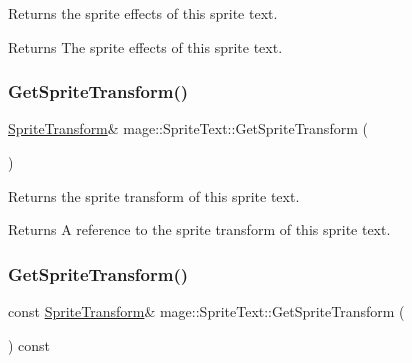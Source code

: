 Returns the sprite effects of this sprite text.

\begin{DoxyReturn}{Returns}
The sprite effects of this sprite text. 
\end{DoxyReturn}
\hypertarget{classmage_1_1_sprite_text_af2d7d48fd0134a9d713c3a4820ac09ba}{}\label{classmage_1_1_sprite_text_af2d7d48fd0134a9d713c3a4820ac09ba} 
\subsubsection{\texorpdfstring{Get\+Sprite\+Transform()}{GetSpriteTransform()}\hspace{0.1cm}{\footnotesize\ttfamily [1/2]}}
{\footnotesize\ttfamily \hyperlink{classmage_1_1_sprite_transform}{Sprite\+Transform}\& mage\+::\+Sprite\+Text\+::\+Get\+Sprite\+Transform (\begin{DoxyParamCaption}{ }\end{DoxyParamCaption})\hspace{0.3cm}{\ttfamily [noexcept]}}

Returns the sprite transform of this sprite text.

\begin{DoxyReturn}{Returns}
A reference to the sprite transform of this sprite text. 
\end{DoxyReturn}
\hypertarget{classmage_1_1_sprite_text_aa1b83ca76e72decf0b476d07a9a35c83}{}\label{classmage_1_1_sprite_text_aa1b83ca76e72decf0b476d07a9a35c83} 
\subsubsection{\texorpdfstring{Get\+Sprite\+Transform()}{GetSpriteTransform()}\hspace{0.1cm}{\footnotesize\ttfamily [2/2]}}
{\footnotesize\ttfamily const \hyperlink{classmage_1_1_sprite_transform}{Sprite\+Transform}\& mage\+::\+Sprite\+Text\+::\+Get\+Sprite\+Transform (\begin{DoxyParamCaption}{ }\end{DoxyParamCaption}) const\hspace{0.3cm}{\ttfamily [noexcept]}}

